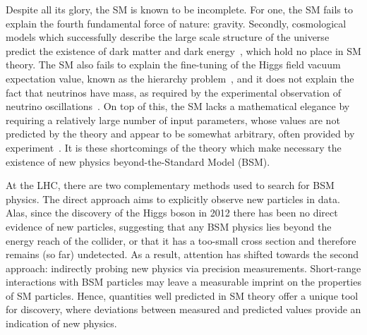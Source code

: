Despite all its glory, the SM is known to be incomplete. For one, the SM fails to explain the fourth fundamental force of nature: gravity. 
Secondly, cosmological models which successfully describe the large scale structure of the universe predict the existence of dark matter and dark energy~\cite{Aghanim:2018eyx}, which hold no place in SM theory. The SM also fails to explain the fine-tuning of the Higgs field vacuum expectation value, known as the hierarchy problem~\cite{PhysRevD.13.974,PhysRevD.20.2619}, and it does not explain the fact that neutrinos have mass, as required by the experimental observation of neutrino oscillations~\cite{Fukuda:1998mi}. On top of this, the SM lacks a mathematical elegance by requiring a relatively large number of input parameters, whose values are not predicted by the theory and appear to be somewhat arbitrary, often provided by experiment~\cite{Zyla:2020zbs}. It is these shortcomings of the theory which make necessary the existence of new physics beyond-the-Standard Model (BSM).

At the LHC, there are two complementary methods used to search for BSM physics. The direct approach aims to explicitly observe new particles in data. Alas, since the discovery of the Higgs boson in 2012 there has been no direct evidence of new particles, suggesting that any BSM physics lies beyond the energy reach of the collider, or that it has a too-small cross section and therefore remains (so far) undetected. As a result, attention has shifted towards the second approach: indirectly probing new physics via precision measurements. Short-range interactions with BSM particles may leave a measurable imprint on the properties of SM particles. Hence, quantities well predicted in SM theory offer a unique tool for discovery, where deviations between measured and predicted values provide an indication of new physics. 

